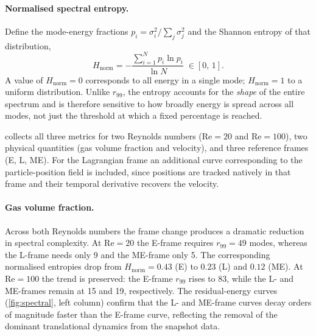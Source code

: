 \documentclass[11pt,a4paper]{article}
\begin{document}
	\paragraph{Normalised spectral entropy.}
	Define the mode-energy fractions
	$p_i = \sigma_i^{2}/\sum_j \sigma_j^{2}$
	and the Shannon entropy of that distribution,
	\begin{equation}\label{eq:Hnorm}
		H_{\mathrm{norm}}
		= -\frac{\sum_{i=1}^{N} p_i \ln p_i}{\ln N}
		\;\in [0,\,1].
	\end{equation}
	A value of $H_{\mathrm{norm}}=0$ corresponds to all energy in a single
	mode; $H_{\mathrm{norm}}=1$ to a uniform distribution.  Unlike $r_{99}$,
	the entropy accounts for the \emph{shape} of the entire spectrum and is
	therefore sensitive to how broadly energy is spread across all modes,
	not just the threshold at which a fixed percentage is reached.
	
	 collects all three metrics for two Reynolds numbers
	($\mathrm{Re}=20$ and $\mathrm{Re}=100$), two physical quantities (gas
	volume fraction and velocity), and three reference frames (E, L, ME).
	For the Lagrangian frame an additional curve corresponding to the
	particle-position field is included, since positions are tracked natively
	in that frame and their temporal derivative recovers the velocity.
	
	\paragraph{Gas volume fraction.}
	Across both Reynolds numbers the frame change produces a dramatic
	reduction in spectral complexity.  At $\mathrm{Re}=20$ the E-frame
	requires $r_{99}=49$ modes, whereas the L-frame needs only 9 and the
	ME-frame only 5.  The corresponding normalised entropies drop from
	$H_{\mathrm{norm}}=0.43$ (E) to $0.23$ (L) and $0.12$ (ME).
	At $\mathrm{Re}=100$ the trend is preserved: the E-frame $r_{99}$
	rises to 83, while the L- and ME-frames remain at 15 and 19,
	respectively.  The residual-energy curves (\cref{fig:spectral},
	left column) confirm that the L- and ME-frame curves decay orders of
	magnitude faster than the E-frame curve, reflecting the removal of
	the dominant translational dynamics from the snapshot data.
	
\end{document}

